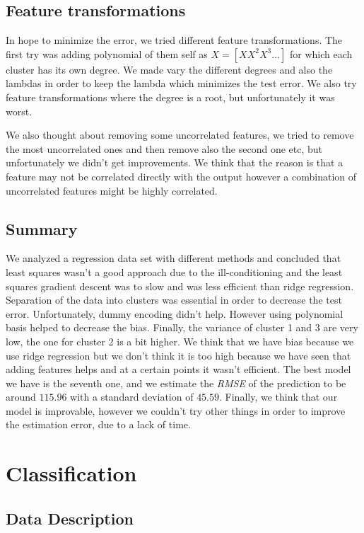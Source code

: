 \documentclass{article} %
\begin{document}
\subsection{Feature transformations}

In hope to minimize the error, we tried different feature transformations. The first try was adding polynomial of them self as $X = [X X^2 X^3 ...]$ for which each cluster has its own degree. We made vary the different degrees and also the lambdas in order to keep the lambda which minimizes the test error. We also try feature transformations where the degree is a root, but unfortunately it was worst.

We also thought about removing some uncorrelated features, we tried to remove the most uncorrelated ones and then remove also the second one etc, but unfortunately we didn't get improvements. We think that the reason is that a feature may not be correlated directly with the output however a combination of uncorrelated features might be highly correlated. 

\subsection{Summary}

We analyzed a regression data set with different methods and concluded that least squares wasn't a good approach due to the ill-conditioning and the least squares gradient descent was to slow and was less efficient than ridge regression. Separation of the data into clusters was essential in order to decrease the test error. Unfortunately, dummy encoding didn't help. However using polynomial basis helped to decrease the bias. Finally, the variance of cluster 1 and 3 are very low, the one for cluster 2 is a bit higher. We think that we have bias because we use ridge regression but we don't think it is too high because we have seen that adding features helps and at a certain points it wasn't efficient. The best model we have is the seventh one, and we estimate the \textit{RMSE} of the prediction to be around $115.96$ with a standard deviation of $45.59$. Finally, we think that our model is improvable, however we couldn't try other things in order to improve the estimation error, due to a lack of time.

\section{Classification}

\subsection{Data Description}
\end{document}
